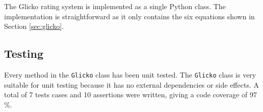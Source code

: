 The Glicko rating system is implemented as a single Python class.
The implementation is straightforward as it only contains the six equations shown in Section \ref{sec:glicko}.

\subsection{Testing}
Every method in the \texttt{Glicko} class has been unit tested.
The \texttt{Glicko} class is very suitable for unit testing because it has no external dependencies or side effects.
A total of 7 tests cases and 10 assertions were written, giving a code coverage of 97 \%.
